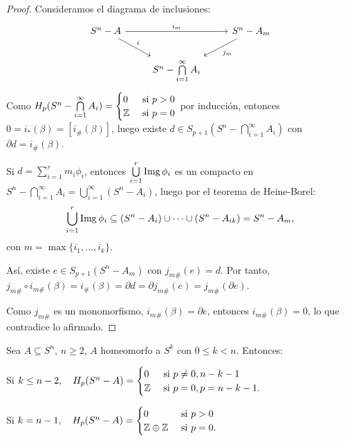 \begin{proof}
  Consideramos el diagrama de inclusiones:
  \[ \begin{tikzcd}
    S^n - A \arrow{dr}{i} \arrow{rr}{i_m} & & S^n - A_m \arrow{dl}{j_m} \\
    & S^n - \bigcap\limits_{i = 1}^\infty A_i
  \end{tikzcd} \]
  Como $H_p(S^n - \bigcap\limits_{i = 1}^\infty A_i) = \begin{cases} 0 &\text{ si } p > 0 \\ \mathbb{Z} &\text{ si } p = 0 \end{cases}$ por inducción, entonces
  $0 = i_*(\beta) = [i_\#(\beta)]$, luego existe $d \in S_{p+1}(S^n - \bigcap\limits_{i = 1}^\infty A_i)$ con $\partial d = i_\#(\beta)$.

  Si $d = \sum\limits_{i = 1}^r m_i \phi_i$, entonces $\bigcup\limits_{i = 1}^r \operatorname{Img} \phi_i$ es un compacto en $S^n - \bigcap\limits_{i = 1}^\infty A_i
  = \bigcup\limits_{i = 1}^\infty (S^n - A_i)$, luego por el teorema de Heine-Borel:
  \[\bigcup\limits_{i = 1}^r \operatorname{Img} \phi_i \subseteq (S^n - A_i) \cup \dots \cup (S^n - A_{ik}) = S^n - A_m, \]
  con $m = \max\{i_1, \dots, i_k\}$.

  Así, existe $e \in S_{p+1}(S^n - A_m)$ con $j_{m\#}(e) = d$. Por tanto, $j_{m\#} \circ i_{m\#} (\beta) = i_\#(\beta) = \partial d
  = \partial j_{m\#}(e) = j_{m\#}(\partial e)$.

  Como $j_{m\#}$ es un monomorfismo, $i_{m\#}(\beta) = \partial e$, entonces $i_{m\#}(\beta) = 0$, lo que contradice lo afirmado.
\end{proof}

\begin{theorem}
  Sea $A \subseteq S^n$, $n \geq 2$, $A$ homeomorfo a $S^k$ con $0 \leq k < n$. Entonces:

  Si $k \leq n-2, \quad H_p(S^n - A) = \begin{cases} 0 &\text{ si } p \neq 0, n-k-1 \\ \mathbb{Z} &\text{ si } p = 0, p = n-k-1. \end{cases}$

  Si $k = n-1, \quad    H_p(S^n - A) = \begin{cases} 0 &\text{ si } p > 0 \\ \mathbb{Z} \oplus \mathbb{Z} &\text{ si } p = 0. \end{cases}$
\end{theorem}

